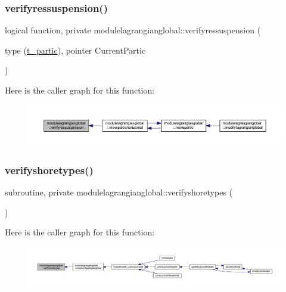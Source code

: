 \subsubsection{\texorpdfstring{verifyressuspension()}{verifyressuspension()}}
{\footnotesize\ttfamily logical function, private modulelagrangianglobal\+::verifyressuspension (\begin{DoxyParamCaption}\item[{type (\mbox{\hyperlink{structmodulelagrangianglobal_1_1t__partic}{t\+\_\+partic}}), pointer}]{Current\+Partic }\end{DoxyParamCaption})\hspace{0.3cm}{\ttfamily [private]}}

Here is the caller graph for this function\+:\nopagebreak
\begin{figure}[H]
\begin{center}
\leavevmode
\includegraphics[width=350pt]{namespacemodulelagrangianglobal_a690a5144506cf803e45f92de5eea31d7_icgraph}
\end{center}
\end{figure}
\mbox{\label{namespacemodulelagrangianglobal_a5abbe7b9c24cce4b55bf9e30a7bb418a}} 
\subsubsection{\texorpdfstring{verifyshoretypes()}{verifyshoretypes()}}
{\footnotesize\ttfamily subroutine, private modulelagrangianglobal\+::verifyshoretypes (\begin{DoxyParamCaption}{ }\end{DoxyParamCaption})\hspace{0.3cm}{\ttfamily [private]}}

Here is the caller graph for this function\+:\nopagebreak
\begin{figure}[H]
\begin{center}
\leavevmode
\includegraphics[width=350pt]{namespacemodulelagrangianglobal_a5abbe7b9c24cce4b55bf9e30a7bb418a_icgraph}
\end{center}
\end{figure}
\mbox{\label{namespacemodulelagrangianglobal_a3b4d2f6226b807632b46704ab7cd6944}} 
